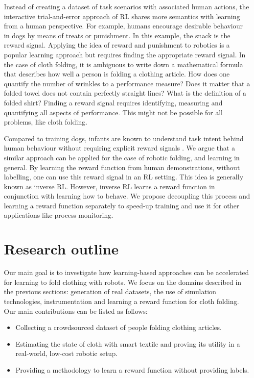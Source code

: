 \documentclass[\home/main.tex]{subfiles}
\begin{document}
Instead of creating a dataset of task scenarios with associated human actions, the interactive trial-and-error approach of \gls{RL} shares more semantics with learning from a human perspective. For example, humans encourage desirable behaviour in dogs by means of treats or punishment. In this example, the snack is the reward signal. Applying the idea of reward and punishment to robotics is a popular learning approach but requires finding the appropriate reward signal. In the case of cloth folding, it is ambiguous to write down a mathematical formula that describes how well a person is folding a clothing article. How does one quantify the number of wrinkles to a performance measure? Does it matter that a folded towel does not contain perfectly straight lines? What is the definition of a folded shirt? Finding a reward signal requires identifying, measuring and quantifying all aspects of performance. This might not be possible for all problems, like cloth folding.

Compared to training dogs, infants are known to understand task intent behind human behaviour without requiring explicit reward signals \autocite{warneken2006altruistic}.
We argue that a similar approach can be applied for the case of robotic folding, and learning in general. By learning the reward function from human demonstrations, without labelling, one can use this reward signal in an \gls{RL} setting. This idea is generally known as inverse \gls{RL}. However, inverse RL learns a reward function in conjunction with learning how to behave. We propose decoupling this process and learning a reward function separately to speed-up training and use it for other applications like process monitoring.

\section{Research outline}
Our main goal is to investigate how learning-based approaches can be accelerated for learning to fold clothing with robots. We focus on the domains described in the previous sections: generation of real datasets, the use of simulation technologies, instrumentation and learning a reward function for cloth folding. Our main contributions can be listed as follows:
\begin{itemize}
    \item Collecting a crowdsourced dataset of people folding clothing articles.
    \item Estimating the state of cloth with smart textile and proving its utility in a real-world, low-cost robotic setup.
    \item Providing a methodology to learn a reward function without providing labels.
\end{itemize}
\end{document}
